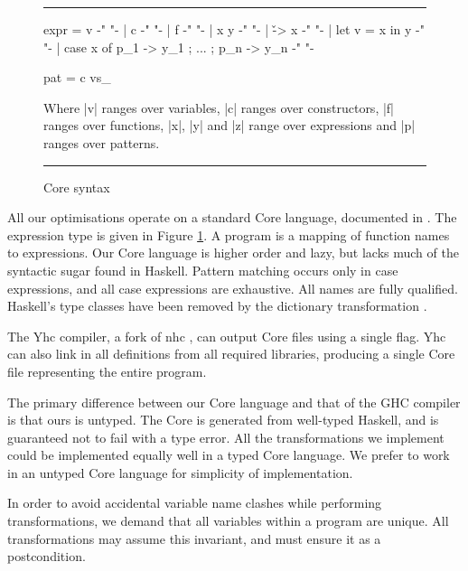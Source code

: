 \documentclass{llncs}
\newenvironment{fig}
    {\begin{figure}[tbp]\hrule}
    {\end{figure}}
\newcommand{\figend}{\hrule}
\begin{document}
\begin{fig}
\begin{code}
expr  =  v                                          {-"  "-}
      |  c                                          {-"  "-}
      |  f                                          {-"  "-}
      |  x y                                        {-"  "-}
      |  \v -> x                                    {-"  "-}
      |  let v = x in y                             {-"  "-}
      |  case x of {p_1 -> y_1 ; ... ; p_n -> y_n}  {-"  "-}

pat   =  c vs_
\end{code}

Where |v| ranges over variables, |c| ranges over constructors, |f| ranges over functions, |x|, |y| and |z| range over expressions and |p| ranges over patterns.
\bigskip
\figend
\caption{Core syntax}
\label{fig:core}
\end{fig}

All our optimisations operate on a standard Core language, documented in \cite{me:yhc_core}. The expression type is given in Figure \ref{fig:core}. A program is a mapping of function names to expressions. Our Core language is higher order and lazy, but lacks much of the syntactic sugar found in Haskell. Pattern matching occurs only in case expressions, and all case expressions are exhaustive. All names are fully qualified. Haskell's type classes have been removed by the dictionary transformation \cite{wadler:type_classes}.

The Yhc compiler, a fork of nhc \cite{nhc}, can output Core files using a single flag. Yhc can also link in all definitions from all required libraries, producing a single Core file representing the entire program.

The primary difference between our Core language and that of the GHC compiler \cite{ghc_core} is that ours is untyped. The Core is generated from well-typed Haskell, and is guaranteed not to fail with a type error. All the transformations we implement could be implemented equally well in a typed Core language. We prefer to work in an untyped Core language for simplicity of implementation.

In order to avoid accidental variable name clashes while performing transformations, we demand that all variables within a program are unique. All transformations may assume this invariant, and must ensure it as a postcondition.
\end{document}
